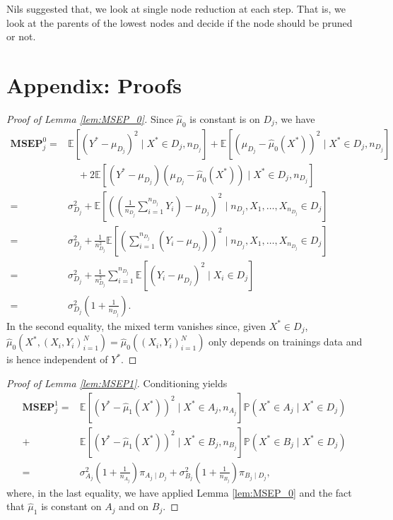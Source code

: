\documentclass[11pt,a4paper]{article}
\renewcommand{\P}{\operatorname{P}}
\newcommand{\E }{\mathbb{E}}  %
\renewcommand{\P}{\mathbb{P}}  %
\newcommand{\MSEP}{\textbf{MSEP}}
\begin{document}
Nils suggested that, we look at single node reduction at each step. That is, we
look at the parents of the lowest nodes and decide if the node should be pruned
or not.



\section{Appendix: Proofs}

\begin{proof}[Proof of Lemma \ref{lem:MSEP_0}]
	Since $\hat \mu_0$ is constant is on $D_j$, we have
	\begin{align*}
		\MSEP_j^0  = & \E\left[ (Y^* - \mu_{D_j})^2 \mid X^* \in D_j,  n_{D_j} \right]
		+ \E \left[ (\mu_{D_j} - \hat\mu_0(X^*))^2 \mid X^* \in D_j, n_{D_j} \right]                                                                           \\
		             & \quad + 2\E \left[ (Y^* - \mu_{D_j})( \mu_{D_j} - \widehat \mu_0(X^*)) \mid X^* \in D_j,  n_{D_j}  \right]                              \\
		=            & \sigma_{D_j}^2 +
		\E \left[ \left(\left(\frac{1}{n_{D_j}}\sum_{i =1}^{n_{D_j}} Y_i \right) - \mu_{D_j}  \right)^2 \mid  n_{D_j}, X_1, \dots, X_{n_{D_j}} \in D_j \right] \\
		=            & \sigma_{D_j}^2 +
		\frac{1}{n_{D_j}^2}\E \left[ \left(\sum_{i =1}^{n_{D_j}} (Y_i - \mu_{D_j}) \right)^2 \mid  n_{D_j}, X_1, \dots, X_{n_{D_j}} \in D_j  \right]           \\
		=            & \sigma_{D_j}^2 +
		\frac{1}{n_{D_j}^2}\sum_{i =1}^{n_{D_j}} \E \left[(Y_i - \mu_{D_j})^2 \mid X_i \in D_j \right]                                                         \\
		=            & \sigma_{{D_j}}^2\left(1 + \frac{1}{n_{D_j}} \right).
	\end{align*}
	In the second equality, the mixed term vanishes since, given $X^* \in D_j$, $\hat \mu_0(X^*, (X_i, Y_i)_{i=1}^N) = \hat \mu_0((X_i, Y_i)_{i=1}^N)$ only depends on trainings data and is hence independent of $Y^*$.
\end{proof}

\begin{proof}[Proof of Lemma \ref{lem:MSEP1}]
	Conditioning yields
	\begin{align*}
		\MSEP^1_j
		= & \E \left[
		\left(Y^* - \hat \mu_1(X^*)\right)^2 \mid X^* \in A_j, n_{A_j} \right] \P(X^* \in A_j \mid X^* \in D_j )                                           \\
		+ & \E \left[
			\left(Y^* - \hat \mu_1(X^*)\right)^2 \mid X^* \in B_j,  n_{B_j}
		\right] \P(X^* \in B_j \mid X^* \in D_j )                                                                                                          \\
		= & \sigma_{{A_j}}^2\left(1 + \frac{1}{n_{A_j}} \right)\pi_{A_j \mid D_j} + \sigma_{{B_j}}^2\left(1 + \frac{1}{n_{B_j}} \right)\pi_{B_j \mid D_j},
	\end{align*}
	where, in the last equality, we have applied Lemma \ref{lem:MSEP_0} and the fact that $\hat \mu_1$ is constant on $A_j$ and on $B_j$.
\end{proof}
\end{document}
